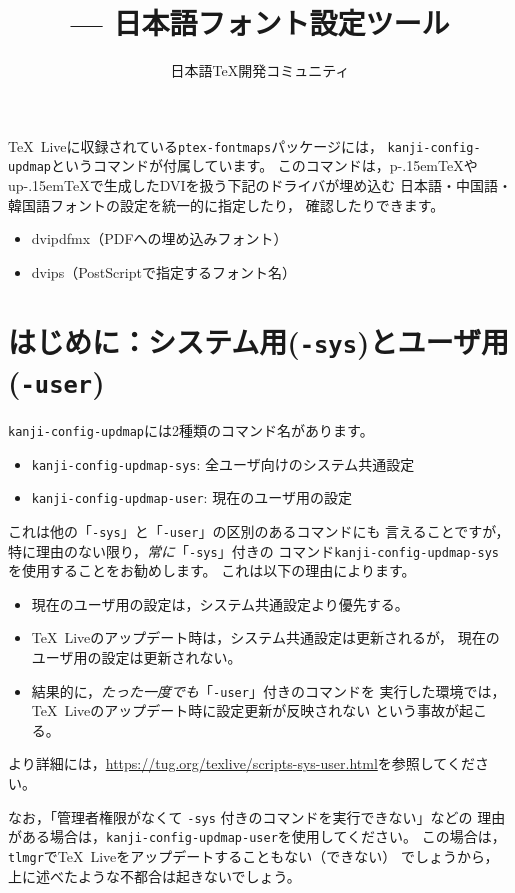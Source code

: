 \documentclass{jlreq}
\title{\command{kanji-config-updmap} --- 日本語フォント設定ツール}
\author{日本語\TeX 開発コミュニティ}
\def\file#1{\texttt{#1}}
\def\command#1{\texttt{#1}}
\def\TL{\TeX~Live}
\def\pTeX{p\kern-.15em\TeX}
\def\upTeX{u\pTeX}
\begin{document}
\maketitle

\TL に収録されている\file{ptex-fontmaps}パッケージには，
\command{kanji-config-updmap}というコマンドが付属しています。
このコマンドは，\pTeX や\upTeX で生成したDVIを扱う下記のドライバが埋め込む
日本語・中国語・韓国語フォントの設定を統一的に指定したり，
確認したりできます。
\begin{itemize}
  \item dvipdfmx（PDFへの埋め込みフォント）
  \item dvips（PostScriptで指定するフォント名）
\end{itemize}

\section{はじめに：システム用(\command{-sys})とユーザ用(\command{-user})}

\command{kanji-config-updmap}には2種類のコマンド名があります。
\begin{itemize}
  \item \command{kanji-config-updmap-sys}: 全ユーザ向けのシステム共通設定
  \item \command{kanji-config-updmap-user}: 現在のユーザ用の設定
\end{itemize}
これは他の「\command{-sys}」と「\command{-user}」の区別のあるコマンドにも
言えることですが，特に理由のない限り，\emph{常に}「\command{-sys}」付きの
コマンド\command{kanji-config-updmap-sys}を使用することをお勧めします。
これは以下の理由によります。
\begin{itemize}
  \item 現在のユーザ用の設定は，システム共通設定より優先する。
  \item \TL のアップデート時は，システム共通設定は更新されるが，
        現在のユーザ用の設定は更新されない。
  \item 結果的に，\emph{たった一度でも}「\command{-user}」付きのコマンドを
        実行した環境では，\TL のアップデート時に設定更新が反映されない
        という事故が起こる。
\end{itemize}
より詳細には，\url{https://tug.org/texlive/scripts-sys-user.html}を参照してください。

なお，「管理者権限がなくて \command{-sys} 付きのコマンドを実行できない」などの
理由がある場合は，\command{kanji-config-updmap-user}を使用してください。
この場合は，\command{tlmgr}で\TL をアップデートすることもない（できない）
でしょうから，上に述べたような不都合は起きないでしょう。
\end{document}
